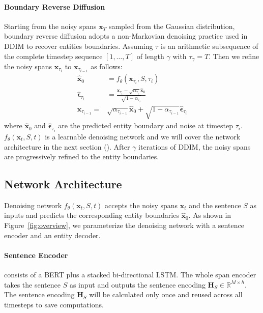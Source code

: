 \documentclass[11pt]{article}
\begin{document}
\paragraph{Boundary Reverse Diffusion}
Starting from the noisy spans $\mathbf{x}_T$ sampled from the Gaussian distribution, boundary reverse diffusion adopts a non-Markovian denoising practice used in DDIM \citep{song2021denoising} to recover entities boundaries. Assuming $\tau$ is an arithmetic subsequence of the complete timestep sequence $[1,\ldots, T]$ of length $\gamma$ with $\tau_\gamma=T$. Then we refine the noisy spans $\mathbf{x}_{\tau_i}$ to $\mathbf{x}_{\tau_{i-1}}$ as follows:
\begin{align}
\label{eq:x0}
\mathbf{\hat{x}}_0 &= f_\theta(\mathbf{x}_{\tau_i}, S, \tau_i)  \\
\mathbf{\hat{\epsilon}}_{\tau_i} &= \frac{\mathbf{x}_{\tau_i}-\sqrt{\alpha_{\tau_i}} \mathbf{\hat{x}}_0}{\sqrt{1-\alpha_{\tau_i}}} \\
\mathbf{x}_{\tau_{i-1}} =& \sqrt{\alpha_{\tau_{i-1}}} \mathbf{\hat{x}}_0+\sqrt{1-\alpha_{\tau_{i-1}}} \mathbf{\hat{\epsilon}}_{\tau_i}
\label{eq:xtau-1}
\end{align}
\noindent where $\mathbf{\hat{x}}_0$ and $\mathbf{\hat{\epsilon}}_{\tau_i}$ are the predicted entity boundary and noise at timestep $\tau_i$. $f_{\theta}(\mathbf{x}_t, S, t)$ is a learnable denoising network and we will cover the network architecture in the next section (). After $\gamma$ iterations of DDIM, the noisy spans are progressively refined to the entity boundaries.


\subsection{Network Architecture}
\label{sec:3.3}
Denoising network $f_\theta(\mathbf{x}_{t}, S, t)$ accepts the noisy spans $\mathbf{x}_{t}$ and the sentence $S$ as inputs and predicts the corresponding entity boundaries $\mathbf{\hat{x}}_0$. As shown in Figure~\ref{fig:overview}, we parameterize the denoising network with a sentence encoder and an entity decoder.


\paragraph{Sentence Encoder} consists of a BERT \citep{devlin-etal-2019-bert} plus a stacked bi-directional LSTM. The whole span encoder takes the sentence ${S}$ as input and outputs the sentence encoding $\mathbf{H}_S \in \mathbb{R}^{M\times h}$. The sentence encoding $\mathbf{H}_S$ will be calculated only once and reused across all timesteps to save computations.
\end{document}
